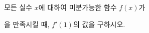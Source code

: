 모든 실수 $x$에 대하여 미분가능한 함수 $f(x)$가 \par\smallskip{}\par\smallskip\noindent 을 만족시킬 때, $f'(1)$의 값을 구하시오.
